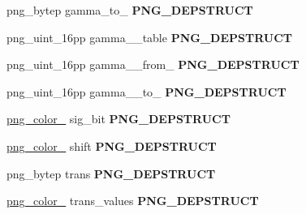\begin{DoxyCompactItemize}
\item 
\hypertarget{structpng__struct__def_a37549ec314ed913d844700a917e7f8f9}{png\-\_\-bytep gamma\-\_\-to\-\_ {\bfseries P\-N\-G\-\_\-\-D\-E\-P\-S\-T\-R\-U\-C\-T}}\label{structpng__struct__def_a37549ec314ed913d844700a917e7f8f9}

\item 
\hypertarget{structpng__struct__def_a88123d9e976e0ee9362bc8aa3e59292b}{png\-\_\-uint\-\_\-16pp gamma\-\_\-\_\-table {\bfseries P\-N\-G\-\_\-\-D\-E\-P\-S\-T\-R\-U\-C\-T}}\label{structpng__struct__def_a88123d9e976e0ee9362bc8aa3e59292b}

\item 
\hypertarget{structpng__struct__def_adf511bd4bd668cfe67734f166d3ef758}{png\-\_\-uint\-\_\-16pp gamma\-\_\-\_\-from\-\_ {\bfseries P\-N\-G\-\_\-\-D\-E\-P\-S\-T\-R\-U\-C\-T}}\label{structpng__struct__def_adf511bd4bd668cfe67734f166d3ef758}

\item 
\hypertarget{structpng__struct__def_ade544b33a1f73a5bb1db2d5ea6399cde}{png\-\_\-uint\-\_\-16pp gamma\-\_\-\_\-to\-\_ {\bfseries P\-N\-G\-\_\-\-D\-E\-P\-S\-T\-R\-U\-C\-T}}\label{structpng__struct__def_ade544b33a1f73a5bb1db2d5ea6399cde}

\item 
\hypertarget{structpng__struct__def_a39d4ae4df4a5ead0799aea2e6b7de5e2}{\hyperlink{structpng__color__8__struct}{png\-\_\-color\-\_} sig\-\_\-bit {\bfseries P\-N\-G\-\_\-\-D\-E\-P\-S\-T\-R\-U\-C\-T}}\label{structpng__struct__def_a39d4ae4df4a5ead0799aea2e6b7de5e2}

\item 
\hypertarget{structpng__struct__def_af303ae02b8bf39d4101c483afdb5c700}{\hyperlink{structpng__color__8__struct}{png\-\_\-color\-\_} shift {\bfseries P\-N\-G\-\_\-\-D\-E\-P\-S\-T\-R\-U\-C\-T}}\label{structpng__struct__def_af303ae02b8bf39d4101c483afdb5c700}

\item 
\hypertarget{structpng__struct__def_af0febb6dbb271d4764a64a77528b9f58}{png\-\_\-bytep trans {\bfseries P\-N\-G\-\_\-\-D\-E\-P\-S\-T\-R\-U\-C\-T}}\label{structpng__struct__def_af0febb6dbb271d4764a64a77528b9f58}

\item 
\hypertarget{structpng__struct__def_afcddd057a6345b01cdaed35729267c84}{\hyperlink{structpng__color__16__struct}{png\-\_\-color\-\_} trans\-\_\-values {\bfseries P\-N\-G\-\_\-\-D\-E\-P\-S\-T\-R\-U\-C\-T}}\label{structpng__struct__def_afcddd057a6345b01cdaed35729267c84}


\end{DoxyCompactItemize}

